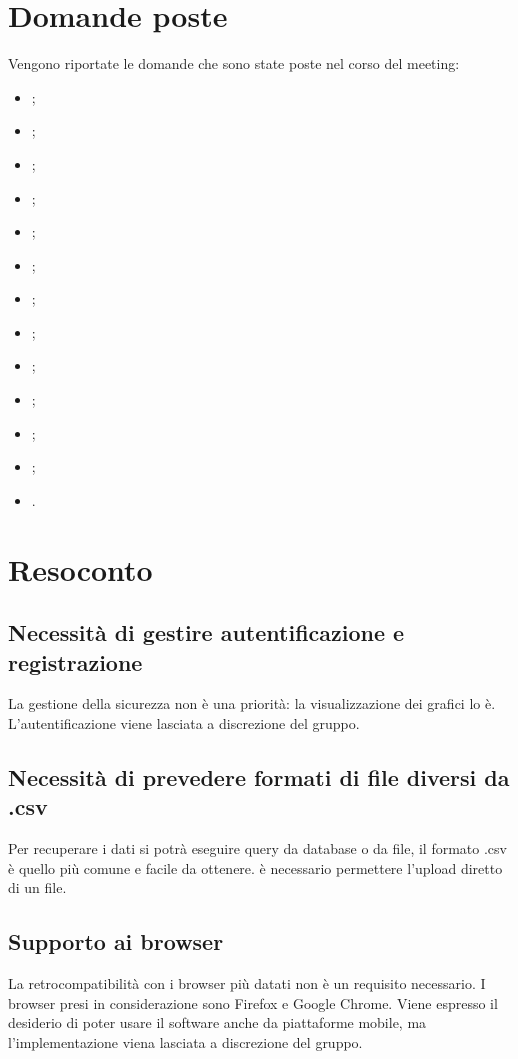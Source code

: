 \documentclass{article}
\begin{document}
\section{Domande poste}
\label{sec:domande_poste}
	Vengono riportate le domande che sono state poste nel corso del meeting:
	\begin{itemize}
		\item {};
		\item {};
		\item {};
		\item {};
		\item {};
		\item {};
		\item {};
		\item {};
		\item {};
		\item {};
		\item {};
		\item {};
        \item {}.
    	\end{itemize}

\section{Resoconto}
\label{sec:resoconto}

	\subsection{Necessità di gestire autentificazione e registrazione}
	\label{sub:domanda_01}
    La gestione della sicurezza non è una priorità: la visualizzazione dei grafici lo è. L'autentificazione viene lasciata a discrezione del gruppo.
    
    \subsection{Necessità di prevedere formati di file diversi da .csv}
	\label{sub:domanda_02}
	Per recuperare i dati si potrà eseguire query da database o da file, il formato .csv è quello più comune e facile da ottenere. è necessario permettere l'upload diretto di un file.
	
    \subsection{Supporto ai browser}
    \label{sub:domanda_03}
    La retrocompatibilità con i browser più datati non è un requisito necessario. I browser presi in considerazione sono Firefox e Google Chrome. Viene espresso il desiderio di poter usare il software anche da piattaforme mobile, ma l'implementazione viena lasciata a discrezione del gruppo.
\end{document}
